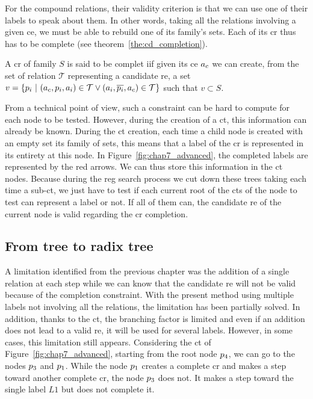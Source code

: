 For the compound relations, their validity criterion is that we can use one of their labels to speak about them. In other words, taking all the relations involving a given \acrshort{ce}, we must be able to rebuild one of its family's sets. Each of its \acrshort{cr} thus has to be complete (see theorem~\ref{the:cd_completion}).

\begin{theorem} 
\label{the:cd_completion}
A \acrshort{cr} of family $S$ is said to be complet iif given its \acrshort{ce} $a_c$ we can create, from the set of relation $\mathcal{T}$ representing a candidate \acrshort{re}, a set $v = \{p_i\ |\ (a_c, p_i, a_i) \in \mathcal{T} \lor (a_i, \overline{p_i}, a_c) \in \mathcal{T} \}$ such that $v \subset S$.
\end{theorem}

From a technical point of view, such a constraint can be hard to compute for each node to be tested. However, during the creation of a \acrshort{ct}, this information can already be known. During the \acrshort{ct} creation, each time a child node is created with an empty set its family of sets, this means that a label of the \acrshort{cr} is represented in its entirety at this node. In Figure~\ref{fig:chap7_advanced}, the completed labels are represented by the red arrows. We can thus store this information in the \acrshort{ct} nodes. Because during the \acrshort{reg} search process we cut down these trees taking each time a sub-\acrshort{ct}, we just have to test if each current root of the \acrshort{ct}s of the node to test can represent a label or not. If all of them can, the candidate \acrshort{re} of the current node is valid regarding the \acrshort{cr} completion.

\subsection{From tree to radix tree}

A limitation identified from the previous chapter was the addition of a single relation at each step while we can know that the candidate \acrshort{re} will not be valid because of the completion constraint. With the present method using multiple labels not involving all the relations, the limitation has been partially solved. In addition, thanks to the \acrshort{ct}, the branching factor is limited and even if an addition does not lead to a valid \acrshort{re}, it will be used for several labels. However, in some cases, this limitation still appears. Considering the \acrlong{ct} of Figure~\ref{fig:chap7_advanced}, starting from the root node $p_4$, we can go to the nodes $p_3$ and $p_1$. While the node $p_1$ creates a complete \acrshort{cr} and makes a step toward another complete \acrshort{cr}, the node $p_3$ does not. It makes a step toward the single label $L1$ but does not complete it.


